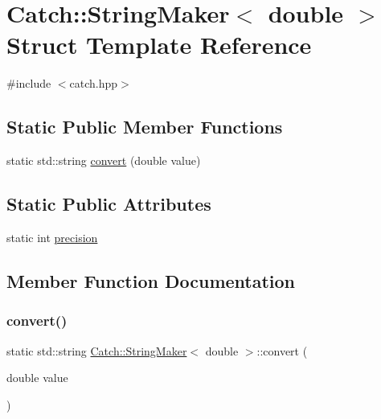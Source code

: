 \hypertarget{struct_catch_1_1_string_maker_3_01double_01_4}{}\section{Catch\+:\+:String\+Maker$<$ double $>$ Struct Template Reference}
\label{struct_catch_1_1_string_maker_3_01double_01_4}


{\ttfamily \#include $<$catch.\+hpp$>$}

\subsection*{Static Public Member Functions}
\begin{DoxyCompactItemize}
\item 
static std\+::string \mbox{\hyperlink{struct_catch_1_1_string_maker_3_01double_01_4_acaa61529acad2462292c747d34e5f3d2}{convert}} (double value)
\end{DoxyCompactItemize}
\subsection*{Static Public Attributes}
\begin{DoxyCompactItemize}
\item 
static int \mbox{\hyperlink{struct_catch_1_1_string_maker_3_01double_01_4_a15fa2b093c532ece7f1d0c713ebaee67}{precision}}
\end{DoxyCompactItemize}


\subsection{Member Function Documentation}
\mbox{\label{struct_catch_1_1_string_maker_3_01double_01_4_acaa61529acad2462292c747d34e5f3d2}} 
\subsubsection{\texorpdfstring{convert()}{convert()}}
{\footnotesize\ttfamily static std\+::string \mbox{\hyperlink{struct_catch_1_1_string_maker}{Catch\+::\+String\+Maker}}$<$ double $>$\+::convert (\begin{DoxyParamCaption}\item[{double}]{value }\end{DoxyParamCaption})\hspace{0.3cm}{\ttfamily [static]}}



